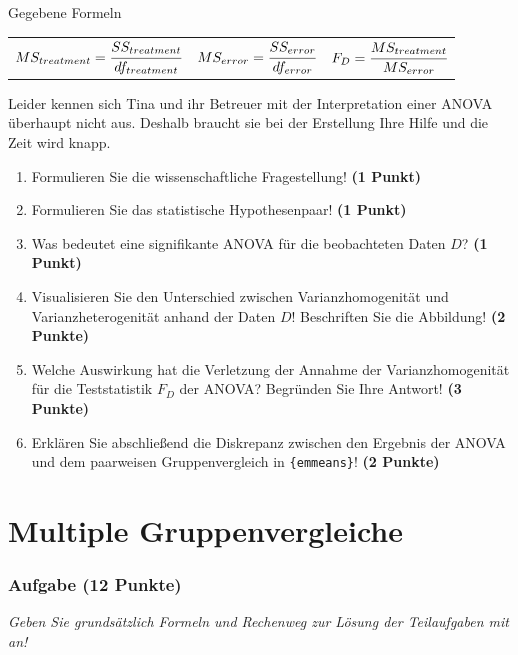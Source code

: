 \documentclass[a4paper, 9pt]{scrartcl}\usepackage[]{graphicx}\usepackage[]{xcolor}
\begin{document}
\begin{graybox}{Gegebene Formeln}
\begin{center}
  \begin{tabular}{ccc}
    $MS_{treatment} = \cfrac{SS_{treatment}}{df_{treatment}}$ &
    $MS_{error} = \cfrac{SS_{error}}{df_{error}}$ &
    $F_{D} = \cfrac{MS_{treatment}}{MS_{error}}$ \\
  \end{tabular}
\end{center}
\end{graybox}

Leider kennen sich Tina und ihr Betreuer mit der Interpretation einer ANOVA überhaupt nicht aus. Deshalb braucht sie bei der Erstellung Ihre Hilfe und die Zeit wird knapp. 

\begin{enumerate}
\item Formulieren Sie die wissenschaftliche Fragestellung! \textbf{(1 Punkt)}
\item Formulieren Sie das statistische Hypothesenpaar! \textbf{(1 Punkt)}
\item Was bedeutet eine signifikante ANOVA für die beobachteten Daten $D$? \textbf{(1 Punkt)}
\item Visualisieren Sie den Unterschied zwischen Varianzhomogenität und Varianzheterogenität anhand der Daten $D$! Beschriften Sie die Abbildung! \textbf{(2 Punkte)} 
\item Welche Auswirkung hat die Verletzung der Annahme der Varianzhomogenität für die Teststatistik $F_D$ der ANOVA? Begründen Sie Ihre Antwort! \textbf{(3 Punkte)}
\item Erklären Sie abschließend die Diskrepanz zwischen den Ergebnis der ANOVA und dem paarweisen Gruppenvergleich in \texttt{\{emmeans\}}! \textbf{(2 Punkte)}
\end{enumerate}

 
\clearpage
\part{Multiple Gruppenvergleiche}

\section{Aufgabe \hfill (12 Punkte)}

\textit{Geben Sie grundsätzlich Formeln und Rechenweg zur Lösung der Teilaufgaben mit an!} \\[1Ex]
 
\end{document}
